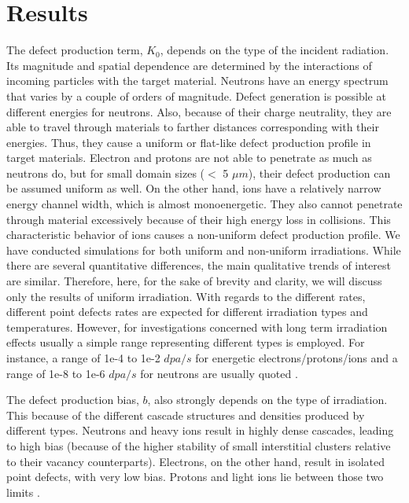 \documentclass[utf8]{frontiersSCNS} %
\begin{document}
\section{Results}
   
    The defect production term, $K_0$, depends on the type of the incident radiation. Its magnitude and spatial dependence are determined by the interactions of incoming particles with the target material. Neutrons have an energy spectrum that varies by a couple of orders of magnitude. Defect generation is possible at different energies for neutrons. Also, because of their charge neutrality, they are able to travel through materials to farther distances corresponding with their energies. Thus, they cause a uniform or flat-like defect production profile in target materials. Electron and protons are not able to penetrate as much as neutrons do, but for small domain sizes ($<$ 5 $\mu m$), their defect production can be assumed uniform as well. On the other hand, ions have a relatively narrow energy channel width, which is almost monoenergetic. They also cannot penetrate through material excessively because of their high energy loss in collisions. This characteristic behavior of ions causes a non-uniform defect production profile. We have conducted simulations for both uniform and non-uniform irradiations. While there are several quantitative differences, the main qualitative trends of interest are similar. Therefore, here, for the sake of brevity and clarity, we will discuss only the results of uniform irradiation. With regards to the different rates, different point defects rates are expected for different irradiation types and temperatures. However, for investigations concerned with long term irradiation effects usually a simple range representing different types is employed. For instance, a range of 1e-4 to 1e-2 $dpa/s$ for energetic electrons/protons/ions and a range of 1e-8 to 1e-6 $dpa/s$ for neutrons are usually quoted \citep{was2017}.
    
    The defect production bias, $b$, also strongly depends on the type of irradiation. This because of the different cascade structures and densities produced by different types. Neutrons and heavy ions result in highly dense cascades, leading to high bias (because of the higher stability of small interstitial clusters relative to their vacancy counterparts). Electrons, on the other hand, result in isolated point defects, with very low bias. Protons and light ions lie between those two limits \citep{was2017}.
\end{document}
